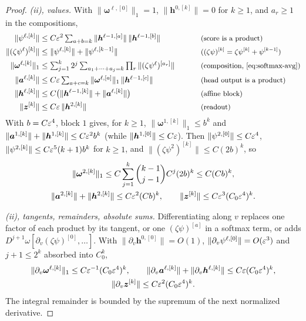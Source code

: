 \begin{proof}
\emph{(ii), values.} With $\|\bm\omega^{\ell,[0]}\|_1=1$, $\|\bm h^{0,[k]}\|=0$ for $k\ge1$, and $a_r\ge1$ in the compositions,
\begin{alignat*}{2}
 \|\psi^{\ell,[k]}\|&\le C\initscale^2\textstyle\sum_{a+b=k}\|\bm h^{\ell-1,[a]}\|\,\|\bm h^{\ell-1,[b]}\| &\qquad& \why{score is a product}\\
 \|(\zeta\psi^\ell)^{[k]}\|&\le\|\psi^{\ell,[k]}\|+\|\psi^{\ell,[k-1]}\| && \why{$(\zeta\psi)^{[k]}=\zeta\psi^{[k]}+\psi^{[k-1]}$}\\
 \|\bm\omega^{\ell,[k]}\|_1&\le\textstyle\sum_{j=1}^k2^j\sum_{a_1+\cdots+a_j=k}\prod_r\|(\zeta\psi^\ell)^{[a_r]}\| && \why{composition, \cref{eq:softmax-avg}}\\
 \|\bm a^{\ell,[k]}\|&\le C\initscale\textstyle\sum_{a+c=k}\|\bm\omega^{\ell,[a]}\|_1\,\|\bm h^{\ell-1,[c]}\| && \why{head output is a product}\\
 \|\bm h^{\ell,[k]}\|&\le C\bigl(\|\bm h^{\ell-1,[k]}\|+\|\bm a^{\ell,[k]}\|\bigr) && \why{affine block}\\
 \|\bm z^{[k]}\|&\le C\initscale\,\|\bm h^{2,[k]}\| && \why{readout}
\end{alignat*}
With $b=C\varepsilon^4$, block $1$ gives, for $k\ge1$, $\|\bm\omega^{1,[k]}\|_1\le b^k$ and $\|\bm a^{1,[k]}\|+\|\bm h^{1,[k]}\|\le C\varepsilon^2b^k$ (while $\|\bm h^{1,[0]}\|\le C\varepsilon$). Then $\|\psi^{2,[0]}\|\le C\varepsilon^4$,
$\|\psi^{2,[k]}\|\le C\varepsilon^5(k+1)b^k$ for $k\ge1$, and $\|(\zeta\psi^2)^{[k]}\|\le C(2b)^k$, so
\begin{gather*}
 \|\bm\omega^{2,[k]}\|_1\le C\sum_{j=1}^k\binom{k-1}{j-1}C^j(2b)^k\le C(Cb)^k,\\
 \|\bm a^{2,[k]}\|+\|\bm h^{2,[k]}\|\le C\varepsilon^2(Cb)^k,\qquad \|\bm z^{[k]}\|\le C\varepsilon^3(C_0\varepsilon^4)^k .
\end{gather*}

\emph{(ii), tangents, remainders, absolute sums.} Differentiating along $v$ replaces one factor of each product by its tangent, or one
$(\zeta\psi)^{[a]}$ in a softmax term, or adds $D^{j+1}\omega[\partial_v(\zeta\psi)^{[0]},\ldots]$. With $\|\partial_v\bm h^{0,[0]}\|=O(1)$, $\|\partial_v\psi^{\ell,[0]}\|=O(\varepsilon^3)$
and $j+1\le2^k$ absorbed into $C_0^k$,
\begin{gather*}
 \|\partial_v\bm\omega^{\ell,[k]}\|_1\le C\varepsilon^{-1}(C_0\varepsilon^4)^k,\qquad \|\partial_v\bm a^{\ell,[k]}\|+\|\partial_v\bm h^{\ell,[k]}\|\le C\varepsilon(C_0\varepsilon^4)^k,\\
 \|\partial_v\bm z^{[k]}\|\le C\varepsilon^2(C_0\varepsilon^4)^k .
\end{gather*}
The integral remainder is bounded by the supremum of the next normalized derivative.


\end{proof}
